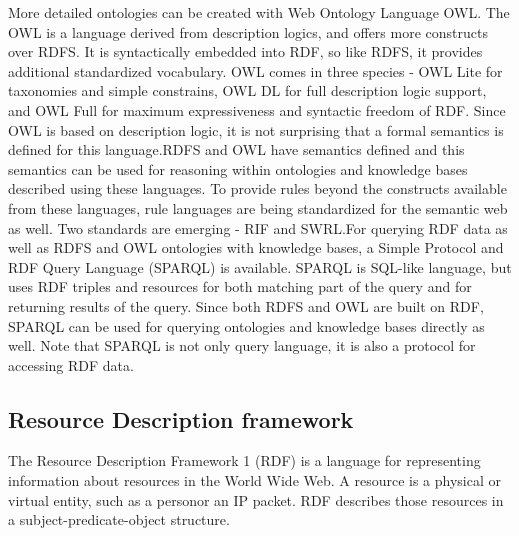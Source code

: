 \documentclass[a4paper,12pt,oneside]{report}
\begin{document}
{{More detailed ontologies can be created with Web Ontology Language OWL. The OWL is a language derived from description logics, and offers more constructs over RDFS. It is syntactically embedded into RDF, so like RDFS, it provides additional standardized vocabulary. OWL comes in three species - OWL Lite for taxonomies and simple constrains, OWL DL for full description logic support, and OWL Full for maximum expressiveness and syntactic freedom of RDF. Since OWL is based on description logic, it is not surprising that a formal semantics is defined for this language.RDFS and OWL have semantics defined and this semantics can be used for reasoning within ontologies and knowledge bases described using these languages. To provide rules beyond the constructs available from these languages, rule languages are being standardized for the semantic web as well. Two standards are emerging - RIF and SWRL.For querying RDF data as well as RDFS and OWL ontologies with knowledge bases, a Simple Protocol and RDF Query Language (SPARQL) is available. SPARQL is SQL-like language, but uses RDF triples and resources for both matching part of the query and for returning results of the query. Since both RDFS and OWL are built on RDF, SPARQL can be used for querying ontologies and knowledge bases directly as well. Note that SPARQL is not only query language, it is also a protocol for accessing RDF data.}
\subsection{Resource Description framework}
{The Resource Description Framework 1 (RDF) is a language for representing information about resources in the World Wide Web. A resource is a physical or virtual entity, such as a personor an IP packet. RDF describes those resources in a subject-predicate-object structure.}
}
\end{document}
